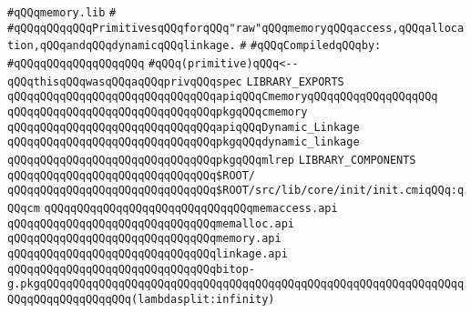 \label{src/lib/c-glue-lib/ram/memory.lib}
\verb|#qQQqmemory.lib|\newline
\verb|#|\newline
\verb|#qQQqqQQqqQQqPrimitivesqQQqforqQQq"raw"qQQqmemoryqQQqaccess,qQQqallocation,qQQqandqQQqdynamicqQQqlinkage.|\newline
\verb|#|\newline
\newline
\verb|#qQQqCompiledqQQqby:|\newline
\verb|#qQQqqQQqqQQqqQQqqQQq|\newline
\newline
\verb|#qQQq(primitive)qQQq<--qQQqthisqQQqwasqQQqaqQQqprivqQQqspec|\newline
\newline
\verb|LIBRARY_EXPORTS|\newline
\newline
\verb|qQQqqQQqqQQqqQQqqQQqqQQqqQQqqQQqapiqQQqCmemoryqQQqqQQqqQQqqQQqqQQq|\newline
\verb|qQQqqQQqqQQqqQQqqQQqqQQqqQQqqQQqpkgqQQqcmemory|\newline
\verb|qQQqqQQqqQQqqQQqqQQqqQQqqQQqqQQqapiqQQqDynamic_Linkage|\newline
\verb|qQQqqQQqqQQqqQQqqQQqqQQqqQQqqQQqpkgqQQqdynamic_linkage|\newline
\verb|qQQqqQQqqQQqqQQqqQQqqQQqqQQqqQQqpkgqQQqmlrep|\newline
\newline
\newline
\newline
\verb|LIBRARY_COMPONENTS|\newline
\newline
\verb|qQQqqQQqqQQqqQQqqQQqqQQqqQQqqQQq$ROOT/|\newline
\verb|qQQqqQQqqQQqqQQqqQQqqQQqqQQqqQQq$ROOT/src/lib/core/init/init.cmiqQQq:qQQqcm|\newline
\newline
\verb|qQQqqQQqqQQqqQQqqQQqqQQqqQQqqQQqmemaccess.api|\newline
\verb|qQQqqQQqqQQqqQQqqQQqqQQqqQQqqQQqmemalloc.api|\newline
\verb|qQQqqQQqqQQqqQQqqQQqqQQqqQQqqQQqmemory.api|\newline
\verb|qQQqqQQqqQQqqQQqqQQqqQQqqQQqqQQqlinkage.api|\newline
\verb|qQQqqQQqqQQqqQQqqQQqqQQqqQQqqQQqbitop-g.pkgqQQqqQQqqQQqqQQqqQQqqQQqqQQqqQQqqQQqqQQqqQQqqQQqqQQqqQQqqQQqqQQqqQQqqQQqqQQqqQQqqQQq(lambdasplit:infinity)|\newline
